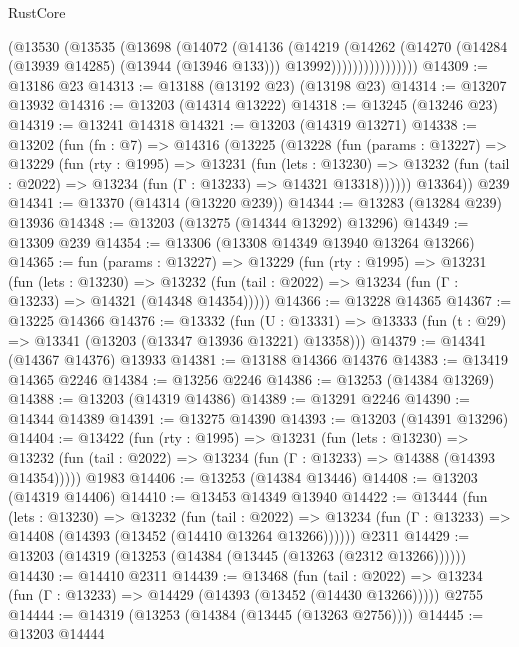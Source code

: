 \begin{lexlean}{RustCore}
\begin{coremodule}
                    (@13530
                      (@13535
                        (@13698
                          (@14072
                            (@14136
                              (@14219
                                (@14262
                                  (@14270
                                    (@14284 (@13939 @14285) (@13944 (@13946 @133)))
                                    @13992))))))))))))))))
@14309 := @13186 @23
@14313 := @13188 (@13192 @23) (@13198 @23)
@14314 := @13207 @13932
@14316 := @13203 (@14314 @13222)
@14318 := @13245 (@13246 @23)
@14319 := @13241 @14318
@14321 := @13203 (@14319 @13271)
@14338 := @13202
    (fun (fn : @7) =>
    @14316
      (@13225
        (@13228
          (fun (params : @13227) =>
          @13229
            (fun (rty : @1995) =>
            @13231
              (fun (lets : @13230) =>
              @13232 (fun (tail : @2022) => @13234 (fun (Γ : @13233) => @14321 @13318))))))
        @13364))
    @239
@14341 := @13370 (@14314 (@13220 @239))
@14344 := @13283 (@13284 @239) @13936
@14348 := @13203 (@13275 (@14344 @13292) @13296)
@14349 := @13309 @239
@14354 := @13306 (@13308 @14349 @13940 @13264 @13266)
@14365 := fun (params : @13227) =>
  @13229
    (fun (rty : @1995) =>
    @13231
      (fun (lets : @13230) =>
      @13232 (fun (tail : @2022) => @13234 (fun (Γ : @13233) => @14321 (@14348 @14354)))))
@14366 := @13228 @14365
@14367 := @13225 @14366
@14376 := @13332
    (fun (U : @13331) => @13333 (fun (t : @29) => @13341 (@13203 (@13347 @13936 @13221) @13358)))
@14379 := @14341 (@14367 @14376) @13933
@14381 := @13188 @14366 @14376
@14383 := @13419 @14365 @2246
@14384 := @13256 @2246
@14386 := @13253 (@14384 @13269)
@14388 := @13203 (@14319 @14386)
@14389 := @13291 @2246
@14390 := @14344 @14389
@14391 := @13275 @14390
@14393 := @13203 (@14391 @13296)
@14404 := @13422
    (fun (rty : @1995) =>
    @13231
      (fun (lets : @13230) =>
      @13232 (fun (tail : @2022) => @13234 (fun (Γ : @13233) => @14388 (@14393 @14354)))))
    @1983
@14406 := @13253 (@14384 @13446)
@14408 := @13203 (@14319 @14406)
@14410 := @13453 @14349 @13940
@14422 := @13444
    (fun (lets : @13230) =>
    @13232
      (fun (tail : @2022) =>
      @13234 (fun (Γ : @13233) => @14408 (@14393 (@13452 (@14410 @13264 @13266))))))
    @2311
@14429 := @13203 (@14319 (@13253 (@14384 (@13445 (@13263 (@2312 @13266))))))
@14430 := @14410 @2311
@14439 := @13468
    (fun (tail : @2022) => @13234 (fun (Γ : @13233) => @14429 (@14393 (@13452 (@14430 @13266)))))
    @2755
@14444 := @14319 (@13253 (@14384 (@13445 (@13263 @2756))))
@14445 := @13203 @14444

\end{coremodule}
\end{lexlean}
